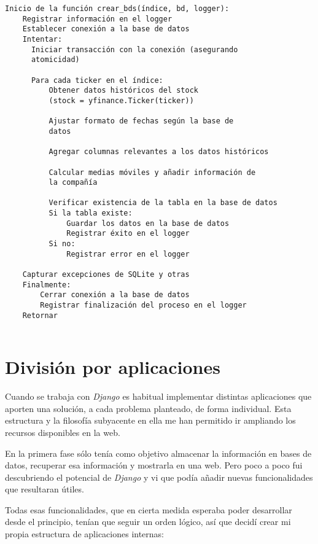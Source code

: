 \begin{verbatim}
Inicio de la función crear_bds(índice, bd, logger):
    Registrar información en el logger
    Establecer conexión a la base de datos
    Intentar:
      Iniciar transacción con la conexión (asegurando 
      atomicidad)

      Para cada ticker en el índice:
          Obtener datos históricos del stock 
          (stock = yfinance.Ticker(ticker))

          Ajustar formato de fechas según la base de 
          datos

          Agregar columnas relevantes a los datos históricos
          
          Calcular medias móviles y añadir información de 
          la compañía

          Verificar existencia de la tabla en la base de datos
          Si la tabla existe:
              Guardar los datos en la base de datos
              Registrar éxito en el logger
          Si no:
              Registrar error en el logger
              
    Capturar excepciones de SQLite y otras
    Finalmente:
        Cerrar conexión a la base de datos
        Registrar finalización del proceso en el logger
    Retornar
                
\end{verbatim}

\section{División por aplicaciones}

Cuando se trabaja con \emph{Django} es habitual implementar distintas aplicaciones que aporten una solución, a cada problema planteado, de forma individual. Esta estructura y la filosofía subyacente en ella me han permitido ir ampliando los recursos disponibles en la web. 

En la primera fase sólo tenía como objetivo almacenar la información en bases de datos, recuperar esa información y mostrarla en una web. Pero poco a poco fui descubriendo el potencial de \emph{Django} y vi que podía añadir nuevas funcionalidades que resultaran útiles. 

Todas esas funcionalidades, que en cierta medida esperaba poder desarrollar desde el principio, tenían que seguir un orden lógico, así que decidí crear mi propia estructura de aplicaciones internas:

